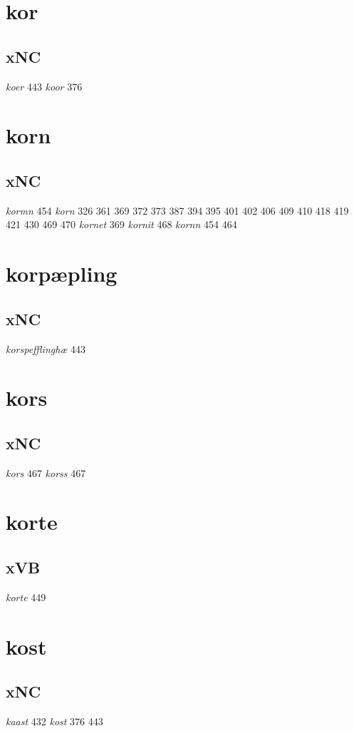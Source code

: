 \documentclass[a4paper,twocolumn]{article}
\begin{document}
\section{kor}
\label{sec:orgaff1844}
\subsection{xNC}
\label{sec:org9e0cd1a}
\emph{koer} 443 \emph{koor} 376 
\section{korn}
\label{sec:orgdd66de2}
\subsection{xNC}
\label{sec:org17d5bb3}
\emph{kormn} 454 \emph{korn} 326 361 369 372 373 387 394 395 401 402 406 409 410 418 419 421 430 469 470 \emph{kornet} 369 \emph{kornit} 468 \emph{kornn} 454 464 
\section{korpæpling}
\label{sec:org5d0c5c2}
\subsection{xNC}
\label{sec:org2158b0c}
\emph{korspefflinghæ} 443 
\section{kors}
\label{sec:org948ee31}
\subsection{xNC}
\label{sec:org39ac994}
\emph{kors} 467 \emph{korss} 467 
\section{korte}
\label{sec:org4d2f43e}
\subsection{xVB}
\label{sec:org0bb410b}
\emph{korte} 449 
\section{kost}
\label{sec:org38b8e1e}
\subsection{xNC}
\label{sec:orgfb9a85c}
\emph{kaast} 432 \emph{kost} 376 443 
\end{document}
